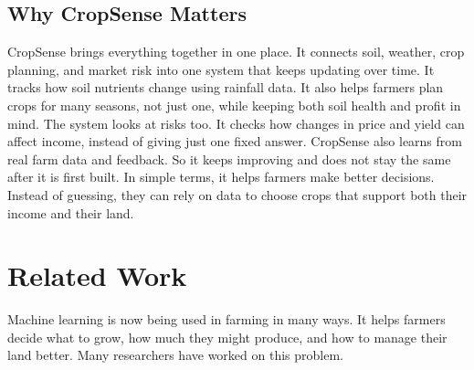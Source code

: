 \documentclass[conference]{IEEEtran}
\begin{document}
\subsection{Why CropSense Matters}

CropSense brings everything together in one place. It connects soil, weather,
crop planning, and market risk into one system that keeps updating over time.
It tracks how soil nutrients change using rainfall data. It also helps farmers
plan crops for many seasons, not just one, while keeping both soil health and
profit in mind. The system looks at risks too. It checks how changes in price
and yield can affect income, instead of giving just one fixed answer. CropSense
also learns from real farm data and feedback. So it keeps improving and does
not stay the same after it is first built. In simple terms, it helps farmers
make better decisions. Instead of guessing, they can rely on data to choose
crops that support both their income and their land.

\section{Related Work}
\label{sec:related}

Machine learning is now being used in farming in many ways. It helps farmers
decide what to grow, how much they might produce, and how to manage their land
better. Many researchers have worked on this problem.
\end{document}
